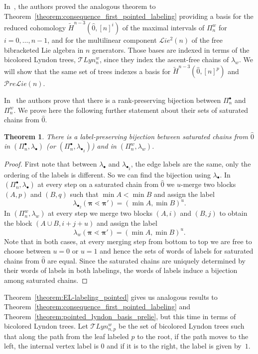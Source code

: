 \documentclass[11pt]{article}
\newtheorem{theo}{Theorem}[section]
\theoremstyle{definition}
\numberwithin{equation}{section}
\newcommand{\Prelie}{\mathcal{P}re\mathcal{L}ie}
\newcommand{\Lie}{\mathcal{L}ie}
\newcommand{\bpi}{\pmb{\pi}}
\begin{document}
    In~\cite{GonzalezDleonWachs2016}, the authors proved the analogous theorem to Theorem~\ref{theorem:consequence_first_pointed_labeling} providing a basis for the reduced cohomology $\widetilde H^{n-3}(\hat{0},[n]^i)$ of the maximal intervals of $\Pi_n^w$ for $i=0,\dots, n-1$, and for the multilinear component $\Lie^2(n)$ of the free bibracketed Lie algebra in $n$ generators. Those bases are indexed in terms of the bicolored Lyndon trees, $\mathcal{T}Lyn^{w}_{n}$,  since they index the ascent-free chains of $\lambda_{w}$. We will show that the same set of trees indexes a basis for $\widetilde H^{n-3}(\hat{0},[n]^p)$ and  $\Prelie(n)$.



    In~\cite{GonzalezDleonWachs2016} the authors prove that there is a rank-preserving bijection between $\Pi_n^{\bullet}$ and $\Pi_n^{w}$. We prove here the following further statement about their sets of saturated chains from $\hat{0}$.

    \begin{theo}\label{Theorem:label-preserving_bijection}
        There is a label-preserving bijection between saturated chains from $\hat{0}$ in $(\Pi_n^{\bullet},\lambda_{\bullet})$ (or $(\Pi_n^{\bullet},\lambda_{\bullet_2})$) and in $(\Pi_n^{w},\lambda_{w})$.
    \end{theo}
    \begin{proof}
    First note that between $\lambda_{\bullet}$ and $\lambda_{\bullet_2}$, the edge labels are the same, only the ordering of the labels is different. So we can find the bijection using $\lambda_{\bullet}$. 
        In $(\Pi_n^{\bullet},\lambda_{\bullet})$ at every step on a saturated chain from $\hat{0}$ we  $u$-merge two blocks $(A,p)$ and $(B,q)$ such that $\min A < \min B$ and assign the label $$\lambda_{\bullet_2}(\bpi\lessdot \bpi')=(\min A, \min B)^u.$$ 
        In $(\Pi_n^{w},\lambda_{w})$ at every step we  merge two blocks $(A,i)$ and $(B,j)$ to obtain the block $(A\cup B, i+j+u)$ and assign the label $$\lambda_{w}(\bpi\lessdot \bpi')=(\min A, \min B)^u.$$
         Note that in both cases, at every merging step from bottom to top we are free to choose between $u=0$ or $u=1$ and hence the sets of words of labels for saturated chains from $\hat{0}$ are equal. Since the saturated chains are uniquely determined by their words of labels in both labelings, the words of labels induce a bijection among saturated chains.
    \end{proof}

     Theorem~\ref{theorem:EL-labeling_pointed} gives us analogous results to  Theorem~\ref{theorem:consequence_first_pointed_labeling} and Theorem~\ref{theorem:pointed_lyndon_basis_prelie}, but this time in terms of bicolored Lyndon trees.
     Let  $\mathcal{T}Lyn_{n,p}^{w}$ be the set of bicolored Lyndon trees such that along the path from the leaf labeled $p$ to the root, if the path moves to the left, the internal vertex label is $0$ and if it is to the right, the label is given by~$1$.
\end{document}

